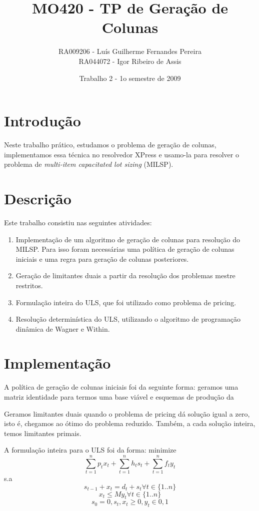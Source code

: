 \documentclass[letterpaper,11pt]{article}
\title{MO420 - TP de Geração de Colunas}
\author{RA009206 - Luís Guilherme Fernandes Pereira \\
RA044072 - Igor Ribeiro de Assis}
\date{Trabalho 2 - 1o semestre de 2009}
\begin{document}
\maketitle

\section{Introdução}

Neste trabalho prático, estudamos o problema de geração de colunas,
implementamos essa técnica no resolvedor XPress e usamo-la para resolver
o problema de \emph{multi-item capacitated lot sizing} (MILSP).

\section{Descrição}
Este trabalho consistiu nas seguintes atividades:

\begin{enumerate}
 \item Implementação de um algoritmo de geração de colunas para
       resolução do MILSP. Para isso foram necessárias uma política de 
       geração de colunas iniciais e uma regra para geração de colunas
       posteriores.
 \item Geração de limitantes duais a partir da resolução dos problemas
       mestre restritos.
 \item Formulação inteira do ULS, que foi utilizado como problema de
       pricing.
 \item Resolução determinística do ULS, utilizando o algoritmo de
       programação dinâmica de Wagner e Within. 
\end{enumerate}

\section{Implementação}
A política de geração de colunas iniciais foi da seguinte forma: geramos
uma matriz identidade para termos uma base viável e esquemas de produção da

Geramos limitantes duais quando o problema de pricing dá solução igual a
zero, isto é, chegamos ao ótimo do problema reduzido. Também, a cada
solução inteira, temos limitantes primais.

A formulação inteira para o ULS foi da forma:
minimize
\begin{equation}
 \sum_{t=1}^n p_tx_t + \sum_{t=1}^n h_ts_t + \sum_{t=1}^n f_ty_t
\end{equation}
s.a
\begin{equation}
 s_{t-1} + x_t = d_t + s_t \forall t \in \{1..n\}
\end{equation}
\begin{equation}
 x_{t} \leq My_t \forall t \in \{1..n\}
\end{equation}
\begin{equation}
 s_0 = 0, s_t, x_t \geq 0, y_t \in {0,1}
\end{equation}
\end{document}
